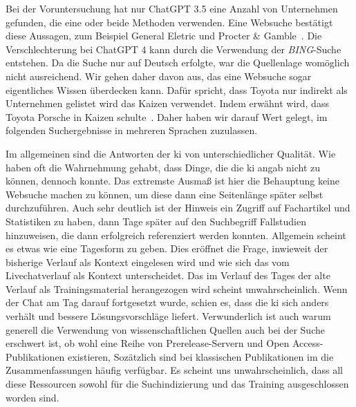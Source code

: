 
Bei der Voruntersuchung hat nur ChatGPT 3.5 eine Anzahl von Unternehmen gefunden, die eine oder beide Methoden verwenden. Eine Websuche bestätigt diese Aussagen, zum Beispiel General Eletric und Procter \& Gamble~\cite{noauthor_heat_nodate,noauthor_what_nodate}. Die Verschlechterung bei ChatGPT 4 kann durch die Verwendung der \textit{BING}-Suche entstehen. Da die Suche nur auf Deutsch erfolgte, war die Quellenlage womöglich nicht ausreichend. Wir gehen daher davon aus, das eine Websuche sogar eigentliches Wissen überdecken kann.
Dafür spricht, dass Toyota nur indirekt als Unternehmen gelistet wird das Kaizen verwendet. Indem erwähnt wird, dass Toyota Porsche in Kaizen schulte~\cite{noauthor_kaizen_nodate}. Daher haben wir darauf Wert gelegt, im folgenden Suchergebnisse in mehreren Sprachen zuzulassen.

Im allgemeinen sind die Antworten der \gls{ki} von unterschiedlicher Qualität. Wie haben oft die Wahrnehmung gehabt, dass Dinge, die die \gls{ki} angab nicht zu können, dennoch konnte. Das extremste Ausmaß ist hier die Behauptung keine Websuche machen zu können, um diese dann eine Seitenlänge später selbst durchzuführen. Auch sehr deutlich ist der Hinweis ein Zugriff auf Fachartikel und Statistiken zu haben, dann Tage später auf den Suchbegriff Fallstudien hinzuweisen, die dann erfolgreich referenziert werden konnten.
Allgemein scheint es etwas wie eine Tagesform zu geben. Dies eröffnet die Frage, inwieweit der bisherige Verlauf als Kontext eingelesen wird und wie sich das vom Livechatverlauf als Kontext unterscheidet. Das im Verlauf des Tages der alte Verlauf als Trainingsmaterial herangezogen wird scheint unwahrscheinlich. Wenn der Chat am Tag darauf fortgesetzt wurde, schien es, dass die \gls{ki} sich anders verhält und bessere Lösungsvorschläge liefert.
Verwunderlich ist auch warum generell die Verwendung von wissenschaftlichen Quellen auch bei der Suche erschwert ist, ob wohl eine Reihe von Prerelease-Servern und Open Access-Publikationen existieren, Sozätzlich sind bei klassischen Publikationen im die Zusammenfassungen häufig verfügbar. Es scheint uns unwahrscheinlich, dass all diese Ressourcen sowohl für die Suchindizierung und das Training ausgeschlossen worden sind.

